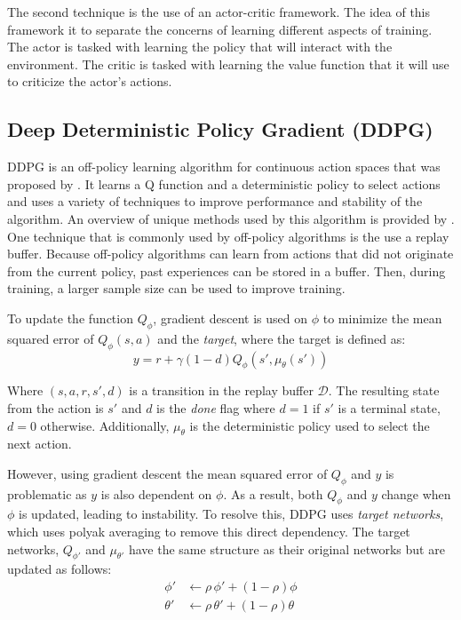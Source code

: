 \documentclass[conference]{IEEEtran}
\begin{document}
The second technique is the use of an actor-critic framework. The idea of this framework it to separate the concerns of learning different aspects of training. The actor is tasked with learning the policy that will interact with the environment. The critic is tasked with learning the value function that it will use to criticize the actor's actions. \cite{deepmind_slides_9}

\subsection{Deep Deterministic Policy Gradient (DDPG)}

DDPG is an off-policy learning algorithm for continuous action spaces that was proposed by \cite{DDPG}. It learns a Q function and a deterministic policy to select actions and uses a variety of techniques to improve performance and stability of the algorithm. An overview of unique methods used by this algorithm is provided by \cite{spinning_up_ddpg}. One technique that is commonly used by off-policy algorithms is the use a replay buffer. Because off-policy algorithms can learn from actions that did not originate from the current policy, past experiences can be stored in a buffer. Then, during training, a larger sample size can be used to improve training.

To update the function $Q_\phi$, gradient descent is used on $\phi$ to minimize the mean squared error of $Q_\phi(s, a)$ and the \textit{target}, where the target is defined as:
$$
    y = r + \gamma(1-d)Q_\phi(s', \mu_\theta(s'))
$$

Where $(s, a, r, s', d)$ is a transition in the replay buffer $\mathcal{D}$. The resulting state from the action is $s'$ and $d$ is the \textit{done} flag where $d=1$ if $s'$ is a terminal state, $d=0$ otherwise. Additionally, $\mu_\theta$ is the deterministic policy used to select the next action.

However, using gradient descent the mean squared error of $Q_\phi$ and $y$ is problematic as $y$ is also dependent on $\phi$. As a result, both $Q_\phi$ and $y$ change when $\phi$ is updated, leading to instability. To resolve this, DDPG uses \textit{target networks}, which uses polyak averaging to remove this direct dependency. The target networks, $Q_{\phi'}$ and $\mu_{\theta'}$ have the same structure as their original networks but are updated as follows:
\begin{align*}
    \phi'   & \leftarrow \rho \, \phi' + (1 - \rho) \phi     \\
    \theta' & \leftarrow \rho \, \theta' + (1 - \rho) \theta
\end{align*}
\end{document}
